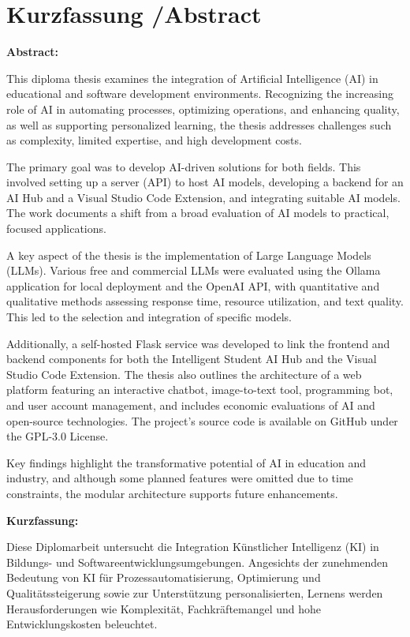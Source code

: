 

\small{\chapter*{Kurzfassung /Abstract }}
\label{cha:abstract}

\small{
\textbf{Abstract:}

This diploma thesis examines the integration of Artificial Intelligence (AI) in educational and software development environments. Recognizing the increasing role of AI in automating processes, optimizing operations, and enhancing quality, as well as supporting personalized learning, the thesis addresses challenges such as complexity, limited expertise, and high development costs.
    
The primary goal was to develop AI-driven solutions for both fields. This involved setting up a server (API) to host AI models, developing a backend for an AI Hub and a Visual Studio Code Extension, and integrating suitable AI models. The work documents a shift from a broad evaluation of AI models to practical, focused applications.
    
A key aspect of the thesis is the implementation of Large Language Models (LLMs). Various free and commercial LLMs were evaluated using the Ollama application for local deployment and the OpenAI API, with quantitative and qualitative methods assessing response time, resource utilization, and text quality. This led to the selection and integration of specific models.
    
Additionally, a self-hosted Flask service was developed to link the frontend and backend components for both the Intelligent Student AI Hub and the Visual Studio Code Extension. The thesis also outlines the architecture of a web platform featuring an interactive chatbot, image-to-text tool, programming bot, and user account management, and includes economic evaluations of AI and open-source technologies. The project’s source code is available on GitHub under the GPL-3.0 License.
    
Key findings highlight the transformative potential of AI in education and industry, and although some planned features were omitted due to time constraints, the modular architecture supports future enhancements.

\newpage

\textbf{Kurzfassung:}
    
Diese Diplomarbeit untersucht die Integration Künstlicher Intelligenz (KI) in Bildungs- und Softwareentwicklungsumgebungen. Angesichts der zunehmenden Bedeutung von KI für Prozessautomatisierung, Optimierung und Qualitätssteigerung sowie zur Unterstützung personalisierten, Lernens werden Herausforderungen wie Komplexität, Fachkräftemangel und hohe Entwicklungskosten beleuchtet.
    
}
